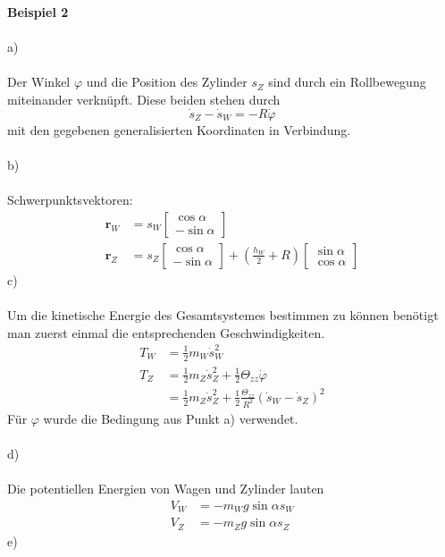 \textbf{Beispiel 2}\\ \\
a)\\ \\
Der Winkel $\varphi$ und die Position des Zylinder $s_Z$ sind durch ein Rollbewegung miteinander verknüpft. Diese beiden stehen durch 
\[
	\dot{s}_Z - \dot{s}_W = -R\dot{\varphi}
\]
mit den gegebenen generalisierten Koordinaten in Verbindung.\\ \\
b)\\ \\
Schwerpunktsvektoren:
\begin{align*}
	\textbf{r}_W &= s_W\begin{bmatrix}
		\cos\alpha \\
		-\sin\alpha
	\end{bmatrix}
	\\
	\textbf{r}_Z &= s_Z\begin{bmatrix}
	 \cos\alpha \\
	 -\sin\alpha
	\end{bmatrix}
	+
	\left(\frac{h_W}{2} + R\right)\begin{bmatrix}
		\sin\alpha \\
		\cos\alpha
	\end{bmatrix}
\end{align*}
c)\\ \\
Um die kinetische Energie des Gesamtsystemes bestimmen zu können benötigt man zuerst einmal die entsprechenden Geschwindigkeiten.
\begin{align*}
	T_W &= \frac{1}{2}m_W\dot{s}_W^2 \\
	T_Z &= \frac{1}{2}m_Z\dot{s}_Z^2 + \frac{1}{2}\Theta_{zz}\dot{\varphi} \\
		&= \frac{1}{2}m_Z\dot{s}_Z^2 + \frac{1}{2}\frac{\Theta_{zz}}{R^2}(\dot{s}_W - \dot{s}_Z)^2
\end{align*}
Für $\varphi$ wurde die Bedingung aus Punkt a) verwendet.\\ \\
d)\\ \\
Die potentiellen Energien von Wagen und Zylinder lauten
\begin{align*}
	V_W &= -m_W g \sin\alpha s_W \\
	V_Z &= -m_Z g \sin\alpha s_Z
\end{align*}
\newpage
\noindent
e)\\ \\
